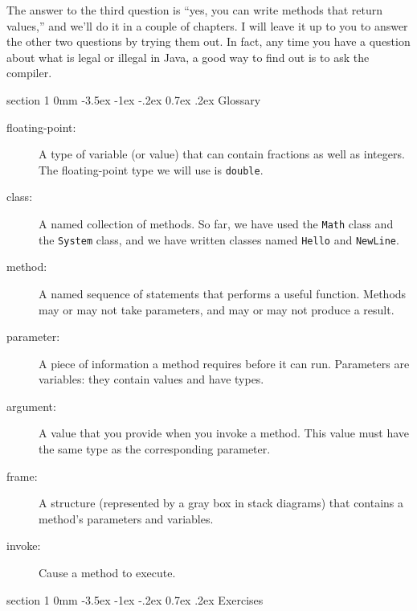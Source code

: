 \documentclass{book}
\makeatletter
\renewcommand{\section}{\@startsection 
    {section} {1} {0mm}%
    {-3.5ex \@plus -1ex \@minus -.2ex}%
    {0.7ex \@plus.2ex}%
    {\normalfont\Large\bfseries}}
\makeatother
\begin{document}
The answer to the third question is ``yes, you can write methods that
return values,'' and we'll do it in a couple of chapters.  I will
leave it up to you to answer the other two questions by trying them
out.  In fact, any time you have a question about what is legal or
illegal in Java, a good way to find out is to ask the compiler.


\section{Glossary}

\begin{description}

\item[floating-point:] A type of variable (or value) that can contain
fractions as well as integers.  The floating-point type we will
use is {\tt double}.

\item[class:]  A named collection of methods.  So far, we have used
the {\tt Math} class and the {\tt System} class, and we have
written classes named {\tt Hello} and {\tt NewLine}.

\item[method:]  A named sequence of statements that performs a
useful function.  Methods may or may not take parameters, and may
or may not produce a result.

\item[parameter:]  A piece of information a method requires before
it can run.  Parameters are variables: they contain values and have types.

\item[argument:]  A value that you provide when you invoke a
method.  This value must have the same type as the corresponding
parameter.

\item[frame:] A structure (represented by a gray box in stack diagrams)
that contains a method's parameters and variables.

\item[invoke:]  Cause a method to execute.


\end{description}

\section{Exercises}
\end{document}
